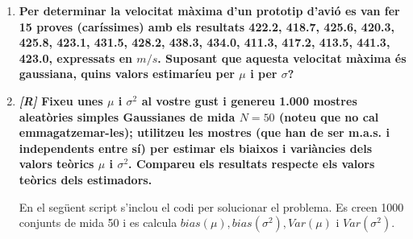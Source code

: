 \documentclass[a4paper]{article}
\begin{document}
\begin{enumerate}
\item \textbf{Per determinar la velocitat màxima d'un prototip d'avió es van fer 15 proves (caríssimes) amb els resultats 422.2, 418.7, 425.6, 420.3, 425.8, 423.1, 431.5, 428.2, 438.3, 434.0, 411.3, 417.2, 413.5, 441.3, 423.0, expressats en $m/s$. Suposant que aquesta velocitat màxima és gaussiana, quins valors estimaríeu per $\mu$ i per $\sigma$?}

\item \textbf{\emph{[R]} Fixeu unes $ \mu $ i $ \sigma^2 $ al vostre gust i genereu 1.000 mostres aleatòries simples Gaussianes de mida $ N = 50 $ (noteu que no cal emmagatzemar-les); utilitzeu les mostres (que han de ser m.a.s. i independents entre sí) per estimar els biaixos i variàncies dels valors teòrics $ \mu $ i $ \sigma^2 $. Compareu els resultats respecte els valors teòrics dels estimadors.}

En el següent script s'inclou el codi per solucionar el problema. Es creen 1000 conjunts de mida 50 i es calcula $ bias(\mu), bias(\sigma^2), Var(\mu)\text{ i } Var(\sigma^2)$.



\end{enumerate}
\end{document}

